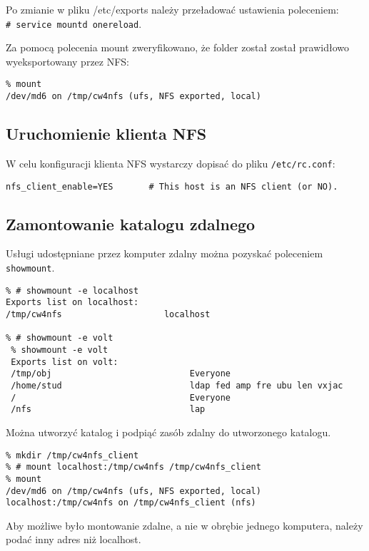 \documentclass[a4paper,11pt]{article}
\begin{document}
Po zmianie w pliku /etc/exports należy przeładować ustawienia poleceniem:\\ \texttt{\# service mountd onereload}.

Za pomocą polecenia mount zweryfikowano, że folder został został prawidłowo wyeksportowany przez NFS:

\footnotesize\begin{verbatim}
% mount
/dev/md6 on /tmp/cw4nfs (ufs, NFS exported, local)
\end{verbatim}\normalsize


\subsection{Uruchomienie klienta NFS}
W celu konfiguracji klienta NFS wystarczy dopisać do pliku \texttt{/etc/rc.conf}:
\footnotesize\begin{verbatim}
nfs_client_enable=YES		# This host is an NFS client (or NO).
\end{verbatim}\normalsize

\subsection{Zamontowanie katalogu zdalnego}

Usługi udostępniane przez komputer zdalny można pozyskać poleceniem \texttt{showmount}.
\footnotesize\begin{verbatim}
% # showmount -e localhost
Exports list on localhost:
/tmp/cw4nfs                    localhost 

% # showmount -e volt
 % showmount -e volt
 Exports list on volt:
 /tmp/obj                           Everyone
 /home/stud                         ldap fed amp fre ubu len vxjac 
 /                                  Everyone
 /nfs                               lap 
\end{verbatim}\normalsize


Można utworzyć katalog i podpiąć zasób zdalny do utworzonego katalogu.

\footnotesize\begin{verbatim}
% mkdir /tmp/cw4nfs_client
% # mount localhost:/tmp/cw4nfs /tmp/cw4nfs_client
% mount
/dev/md6 on /tmp/cw4nfs (ufs, NFS exported, local)
localhost:/tmp/cw4nfs on /tmp/cw4nfs_client (nfs)
\end{verbatim}\normalsize

Aby możliwe było montowanie zdalne, a nie w obrębie jednego komputera, należy podać inny adres niż localhost.
\end{document}
